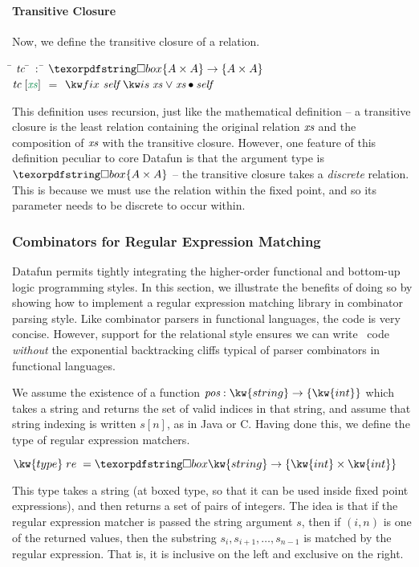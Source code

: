 \paragraph{Transitive Closure}\label{sec:generic-transitive-closure}
Now, we define the transitive closure of a relation. 
\begin{tabbing}
  \qquad\=\+ \kill
  $\text{\itshape tc}$ \qquad \= $\,:$ \;\;\= $\iso{\tset{A \times A}} \to \tset{A \times A}$ \\
  $\name{tc}\;\ebox{\mathit{xs}}$ \> $=$ \> $\efixis{\name{self}}{\name{xs} \vee \name{xs} \bullet\name{self}}$ 
\end{tabbing}

This definition uses recursion, just like the mathematical definition --
a transitive closure is the least relation containing the original relation $\text{\itshape xs}$
and the composition of $\text{\itshape xs}$ with the transitive closure. However, one
feature of this definition peculiar to core Datafun is that the argument type
is $\iso \tset{A \times A}$ -- the transitive closure takes a \emph{discrete} relation.
This is because we must use the relation within the fixed point, and so its parameter needs
to be discrete to occur within. 


\subsubsection{Combinators for Regular Expression Matching}

Datafun permits tightly integrating the higher-order functional and
bottom-up logic programming styles. In this section, we illustrate the
benefits of doing so by showing how to implement a regular expression
matching library in combinator parsing style.  Like combinator parsers
in functional languages, the code is very concise.  However, support
for the relational style ensures we can write \naive\ code
\emph{without} the exponential backtracking cliffs typical of parser
combinators in functional languages.

We assume the existence of a function
$\name{pos} : \kw{string} \to \tset{\kw{int}}$ which takes a string
and returns the set of valid indices in that string, and assume
that string indexing is written $s[n]$, as in Java or C. Having done this, we define
the type of regular expression matchers.
\begin{tabbing} 
\qquad  $\kw{type}\;re\;=\iso \kw{string} \to \tset{\kw{int} \times \kw{int}}$  
\end{tabbing}
This type takes a string (at boxed type, so that it can be used inside
fixed point expressions), and then returns a set of pairs of integers. The
idea is that if the regular expression matcher is passed the string
argument $s$, then if $(i, n)$ is one of the returned values, then the
substring $s_i, s_{i+1}, \ldots, s_{n-1}$ is matched by the regular expression.
That is, it is inclusive on the left and exclusive on the right. 

